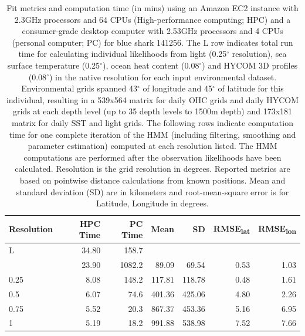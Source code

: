 \begin{table}
\caption[\texttt{HMMoce} model fit metrics, grid resolution and computation time]{Fit metrics and computation time (in mins) using an Amazon EC2 instance with 2.3GHz processors and 64 CPUs (High-performance computing; HPC) and a consumer-grade desktop computer with 2.53GHz processors and 4 CPUs (personal computer; PC) for blue shark 141256. The L row indicates total run time for calculating individual likelihoods from light (0.25$^{\circ}$ resolution), sea surface temperature (0.25$^{\circ}$), ocean heat content (0.08$^{\circ}$) and HYCOM 3D profiles (0.08$^{\circ}$) in the native resolution for each input environmental dataset. Environmental grids spanned 43$^{\circ}$ of longitude and 45$^{\circ}$ of latitude for this individual, resulting in a 539x564 matrix for daily OHC grids and daily HYCOM grids at each depth level (up to 35 depth levels to 1500m depth) and 173x181 matrix for daily SST and light grids. The following rows indicate computation time for one complete iteration of the HMM (including filtering, smoothing and parameter estimation) computed at each resolution listed. The HMM computations are performed after the observation likelihoods have been calculated. Resolution is the grid resolution in degrees. Reported metrics are based on pointwise distance calculations from known positions. Mean and standard deviation (SD) are in kilometers and root-mean-square error is for Latitude, Longitude in degrees.}

\label{tab:a1t2}
\centering
\begin{tabular}[t]{lrrrrrr}
\toprule
\textbf{Resolution} & \textbf{HPC Time} & \textbf{PC Time} & \textbf{Mean} & \textbf{SD} & \textbf{\texorpdfstring{RMSE\textsubscript{lat}}{RMSElat}
} & \textbf{\texorpdfstring{RMSE\textsubscript{lon}}{RMSElon}}\\
\midrule
L & 34.80 & 158.7 &  &  &  & \\
\addlinespace
0.08 & 23.90 & 1082.2 & 89.09 & 69.54 & 0.53 & 1.03\\
0.25 & 8.08 & 148.2 & 117.81 & 118.78 & 0.48 & 1.61\\
0.5 & 6.07 & 74.6 & 401.36 & 425.06 & 4.80 & 2.26\\
0.75 & 5.52 & 20.3 & 867.37 & 453.36 & 5.16 & 6.95\\
1 & 5.19 & 18.2 & 991.88 & 538.98 & 7.52 & 7.66\\
\bottomrule
\end{tabular}
\end{table}
